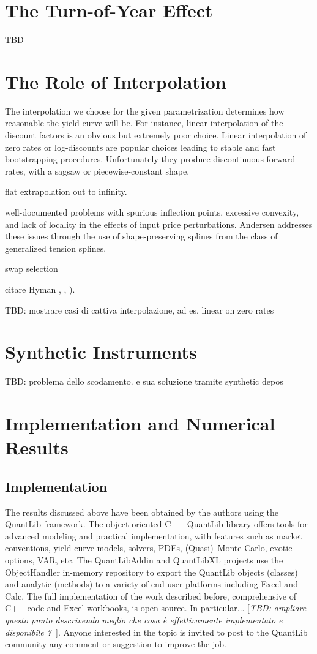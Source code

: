 \documentclass[11pt,reqno]{amsart}
\begin{document}
\section{\label{SecTOY}The Turn-of-Year Effect}
TBD


\section{\label{SecInterp}The Role of Interpolation}
The interpolation we choose for the given parametrization determines how reasonable the yield curve will be. For instance, linear interpolation of the discount factors is an obvious but extremely poor choice. Linear interpolation of zero rates or log-discounts are popular choices leading to stable and fast bootstrapping procedures. Unfortunately they produce discontinuous forward rates, with a sagsaw or piecewise-constant shape.

flat extrapolation out to infinity.

well-documented problems with spurious inflection points, excessive convexity, and lack of locality in the effects of input price perturbations. Andersen \cite{And07} addresses these issues through the use of shape-preserving splines from the class of generalized tension splines.

swap selection

citare Hyman \cite{Hym1983}, \cite{HagWes06}, \cite{HagWes08}).


TBD: mostrare casi di cattiva interpolazione, ad es. linear on zero rates


\section{\label{SecSynt}Synthetic Instruments}
TBD:
problema dello scodamento. e sua soluzione tramite synthetic depos


\section{\label{SecimplementationResults}Implementation and Numerical Results}
\subsection{Implementation}
The results discussed above have been obtained by the authors using the QuantLib framework. The object oriented C++ QuantLib library \cite{QuantLib} offers tools for advanced modeling and practical implementation, with features such as market conventions, yield curve models, solvers, PDEs, (Quasi)\ Monte Carlo, exotic options, VAR, etc. The QuantLibAddin \cite{QuantLibAddin} and QuantLibXL \cite{QuantLibXL} projects use the ObjectHandler in-memory repository \cite{ObjectHandler} to export the QuantLib objects (classes) and analytic (methods) to a variety of end-user platforms including Excel and Calc. The full implementation of the work described before, comprehensive of C++ code and Excel workbooks, is open source. In particular...
[\emph{TBD: ampliare questo punto descrivendo meglio che cosa \`{e} effettivamente implementato e disponibile ?\ }]. Anyone interested in the topic is invited to post to the QuantLib community any comment or suggestion to improve the job.
\end{document}
